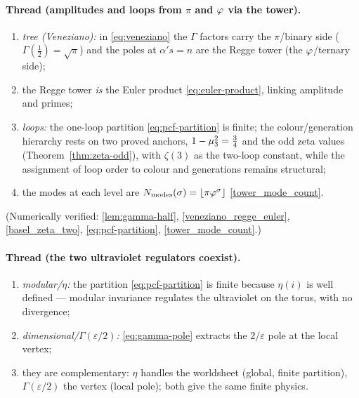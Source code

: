 \paragraph{Thread (amplitudes and loops from $\pi$ and $\varphi$ via the tower).}
\begin{enumerate}
  \item \emph{tree (Veneziano):} in \eqref{eq:veneziano} the $\Gamma$ factors carry the $\pi$/binary
        side ($\Gamma(\tfrac12)=\sqrt\pi$) and the poles at $\alpha's=n$ are the Regge tower (the
        $\varphi$/ternary side);
  \item the Regge tower \emph{is} the Euler product \eqref{eq:euler-product}, linking amplitude and primes;
  \item \emph{loops:} the one-loop partition \eqref{eq:pcf-partition} is finite; the
        colour/generation hierarchy rests on two proved anchors, $1-\mu_{3}^{2}=\tfrac34$ and the
        odd zeta values (Theorem~\ref{thm:zeta-odd}), with $\zeta(3)$ as the two-loop constant,
        while the assignment of loop order to colour and generations remains structural;
  \item the modes at each level are $N_{\mathrm{modes}}(\sigma)=\lfloor\pi\varphi^{\sigma}\rfloor$ \eqref{tower_mode_count}.
\end{enumerate}
(Numerically verified: \eqref{lem:gamma-half}, \eqref{veneziano_regge_euler}, \eqref{basel_zeta_two}, \eqref{eq:pcf-partition}, \eqref{tower_mode_count}.)

\paragraph{Thread (the two ultraviolet regulators coexist).}
\begin{enumerate}
  \item \emph{modular/$\eta$:} the partition \eqref{eq:pcf-partition} is finite because $\eta(i)$ is
        well defined --- modular invariance regulates the ultraviolet on the torus, with no divergence;
  \item \emph{dimensional/$\Gamma(\varepsilon/2)$:} \eqref{eq:gamma-pole} extracts the $2/\varepsilon$
        pole at the local vertex;
  \item they are complementary: $\eta$ handles the worldsheet (global, finite partition),
        $\Gamma(\varepsilon/2)$ the vertex (local pole); both give the same finite physics.
\end{enumerate}


